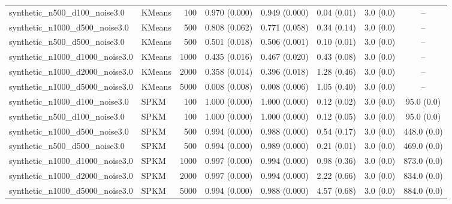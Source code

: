 \begin{table}[t]
\begin{tabular}{llrccccc}
synthetic_n500_d100_noise3.0 & KMeans & 100 & 0.970 (0.000) & 0.949 (0.000) & 0.04 (0.01) & 3.0 (0.0) & -- \\
synthetic_n1000_d500_noise3.0 & KMeans & 500 & 0.808 (0.062) & 0.771 (0.058) & 0.34 (0.14) & 3.0 (0.0) & -- \\
synthetic_n500_d500_noise3.0 & KMeans & 500 & 0.501 (0.018) & 0.506 (0.001) & 0.10 (0.01) & 3.0 (0.0) & -- \\
synthetic_n1000_d1000_noise3.0 & KMeans & 1000 & 0.435 (0.016) & 0.467 (0.020) & 0.43 (0.08) & 3.0 (0.0) & -- \\
synthetic_n1000_d2000_noise3.0 & KMeans & 2000 & 0.358 (0.014) & 0.396 (0.018) & 1.28 (0.46) & 3.0 (0.0) & -- \\
synthetic_n1000_d5000_noise3.0 & KMeans & 5000 & 0.008 (0.008) & 0.008 (0.006) & 1.05 (0.40) & 3.0 (0.0) & -- \\
synthetic_n1000_d100_noise3.0 & SPKM & 100 & 1.000 (0.000) & 1.000 (0.000) & 0.12 (0.02) & 3.0 (0.0) & 95.0 (0.0) \\
synthetic_n500_d100_noise3.0 & SPKM & 100 & 1.000 (0.000) & 1.000 (0.000) & 0.12 (0.05) & 3.0 (0.0) & 95.0 (0.0) \\
synthetic_n1000_d500_noise3.0 & SPKM & 500 & 0.994 (0.000) & 0.988 (0.000) & 0.54 (0.17) & 3.0 (0.0) & 448.0 (0.0) \\
synthetic_n500_d500_noise3.0 & SPKM & 500 & 0.994 (0.000) & 0.989 (0.000) & 0.21 (0.01) & 3.0 (0.0) & 469.0 (0.0) \\
synthetic_n1000_d1000_noise3.0 & SPKM & 1000 & 0.997 (0.000) & 0.994 (0.000) & 0.98 (0.36) & 3.0 (0.0) & 873.0 (0.0) \\
synthetic_n1000_d2000_noise3.0 & SPKM & 2000 & 0.997 (0.000) & 0.994 (0.000) & 2.22 (0.66) & 3.0 (0.0) & 834.0 (0.0) \\
synthetic_n1000_d5000_noise3.0 & SPKM & 5000 & 0.994 (0.000) & 0.988 (0.000) & 4.57 (0.68) & 3.0 (0.0) & 884.0 (0.0) \\
\bottomrule
\end{tabular}
\end{table}
